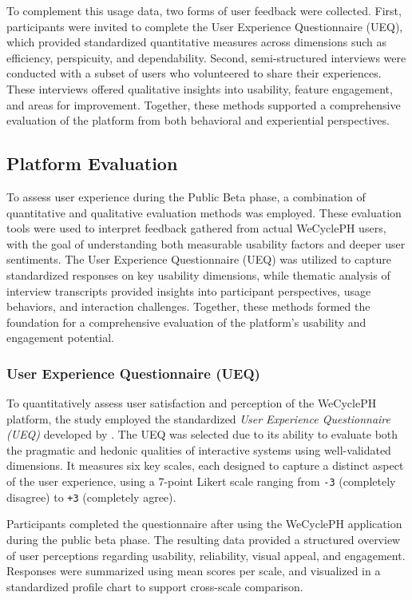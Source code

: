 To complement this usage data, two forms of user feedback were collected. First, participants were invited to complete the User Experience Questionnaire (UEQ), which provided standardized quantitative measures across dimensions such as efficiency, perspicuity, and dependability. Second, semi-structured interviews were conducted with a subset of users who volunteered to share their experiences. These interviews offered qualitative insights into usability, feature engagement, and areas for improvement. Together, these methods supported a comprehensive evaluation of the platform from both behavioral and experiential perspectives.


\subsection{Platform Evaluation}

To assess user experience during the Public Beta phase, a combination of quantitative and qualitative evaluation methods was employed. These evaluation tools were used to interpret feedback gathered from actual WeCyclePH users, with the goal of understanding both measurable usability factors and deeper user sentiments. The User Experience Questionnaire (UEQ) was utilized to capture standardized responses on key usability dimensions, while thematic analysis of interview transcripts provided insights into participant perspectives, usage behaviors, and interaction challenges. Together, these methods formed the foundation for a comprehensive evaluation of the platform's usability and engagement potential.

\subsubsection{User Experience Questionnaire (UEQ)}

To quantitatively assess user satisfaction and perception of the WeCyclePH platform, the study employed the standardized \textit{User Experience Questionnaire (UEQ)} developed by \citet{Schrepp:2017}. The UEQ was selected due to its ability to evaluate both the pragmatic and hedonic qualities of interactive systems using well-validated dimensions. It measures six key scales, each designed to capture a distinct aspect of the user experience, using a 7-point Likert scale ranging from \texttt{-3} (completely disagree) to \texttt{+3} (completely agree).

Participants completed the questionnaire after using the WeCyclePH application during the public beta phase. The resulting data provided a structured overview of user perceptions regarding usability, reliability, visual appeal, and engagement. Responses were summarized using mean scores per scale, and visualized in a standardized profile chart to support cross-scale comparison.

